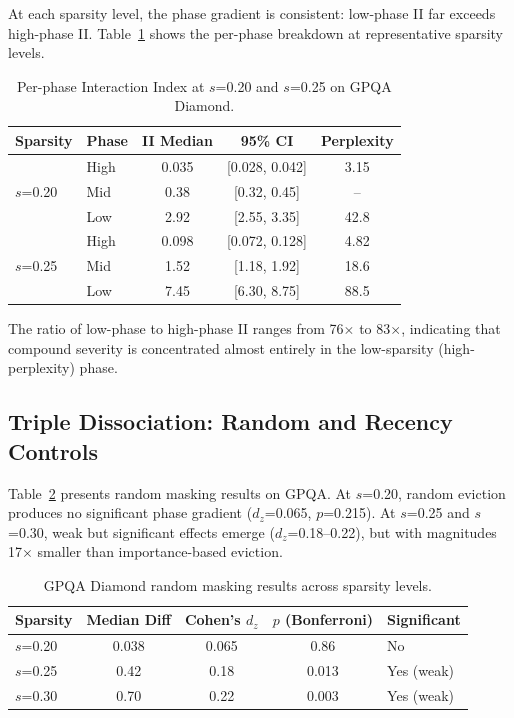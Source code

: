 \documentclass[11pt,a4paper]{article}
\begin{document}
At each sparsity level, the phase gradient is consistent: low-phase II far exceeds high-phase II. Table~\ref{tab:gpqa_phase_breakdown} shows the per-phase breakdown at representative sparsity levels.

\begin{table}[h]
\centering
\caption{Per-phase Interaction Index at $s$=0.20 and $s$=0.25 on GPQA Diamond.}
\label{tab:gpqa_phase_breakdown}
\begin{tabular}{llccc}
\toprule
Sparsity & Phase & II Median & 95\% CI & Perplexity \\
\midrule
\multirow{3}{*}{$s$=0.20} & High & 0.035 & [0.028, 0.042] & 3.15 \\
 & Mid & 0.38 & [0.32, 0.45] & -- \\
 & Low & 2.92 & [2.55, 3.35] & 42.8 \\
\midrule
\multirow{3}{*}{$s$=0.25} & High & 0.098 & [0.072, 0.128] & 4.82 \\
 & Mid & 1.52 & [1.18, 1.92] & 18.6 \\
 & Low & 7.45 & [6.30, 8.75] & 88.5 \\
\bottomrule
\end{tabular}
\end{table}

The ratio of low-phase to high-phase II ranges from 76$\times$ to 83$\times$, indicating that compound severity is concentrated almost entirely in the low-sparsity (high-perplexity) phase.

\subsection{Triple Dissociation: Random and Recency Controls}

Table~\ref{tab:gpqa_random} presents random masking results on GPQA. At $s$=0.20, random eviction produces no significant phase gradient ($d_z$=0.065, $p$=0.215). At $s$=0.25 and $s$=0.30, weak but significant effects emerge ($d_z$=0.18--0.22), but with magnitudes 17$\times$ smaller than importance-based eviction.

\begin{table}[h]
\centering
\caption{GPQA Diamond random masking results across sparsity levels.}
\label{tab:gpqa_random}
\begin{tabular}{lcccl}
\toprule
Sparsity & Median Diff & Cohen's $d_z$ & $p$ (Bonferroni) & Significant \\
\midrule
$s$=0.20 & 0.038 & 0.065 & 0.86 & No \\
$s$=0.25 & 0.42 & 0.18 & 0.013 & Yes (weak) \\
$s$=0.30 & 0.70 & 0.22 & 0.003 & Yes (weak) \\
\bottomrule
\end{tabular}
\end{table}
\end{document}
